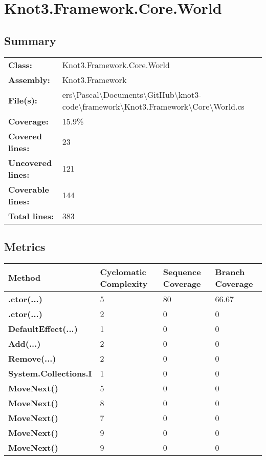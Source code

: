 \documentclass[a4paper,10pt]{article}
\begin{document}
\section{Knot3.Framework.Core.World}
\subsection{Summary}
\begin{longtable}[l]{ll}
\textbf{Class:} & Knot3.Framework.Core.World\\
\textbf{Assembly:} & Knot3.Framework\\
\textbf{File(s):} & \begin{minipage}[t]{12cm}{ers\textbackslash Pascal\textbackslash Documents\textbackslash GitHub\textbackslash knot3-code\textbackslash framework\textbackslash Knot3.Framework\textbackslash Core\textbackslash World.cs}\end{minipage} \\
\textbf{Coverage:} & 15.9\%\\
\textbf{Covered lines:} & 23\\
\textbf{Uncovered lines:} & 121\\
\textbf{Coverable lines:} & 144\\
\textbf{Total lines:} & 383\\
\end{longtable}
\subsection{Metrics}
\begin{longtable}[l]{|l|l|l|l|}
\hline
\textbf{Method} & \textbf{Cyclomatic Complexity} & \textbf{Sequence Coverage} & \textbf{Branch Coverage}\\
\hline
\textbf{.ctor(...)} & 5 & 80 & 66.67\\
\hline
\textbf{.ctor(...)} & 2 & 0 & 0\\
\hline
\textbf{DefaultEffect(...)} & 1 & 0 & 0\\
\hline
\textbf{Add(...)} & 2 & 0 & 0\\
\hline
\textbf{Remove(...)} & 2 & 0 & 0\\
\hline
\textbf{System.Collections.I} & 1 & 0 & 0\\
\hline
\textbf{MoveNext()} & 5 & 0 & 0\\
\hline
\textbf{MoveNext()} & 8 & 0 & 0\\
\hline
\textbf{MoveNext()} & 7 & 0 & 0\\
\hline
\textbf{MoveNext()} & 9 & 0 & 0\\
\hline
\textbf{MoveNext()} & 9 & 0 & 0\\
\hline
\end{longtable}
\end{document}
